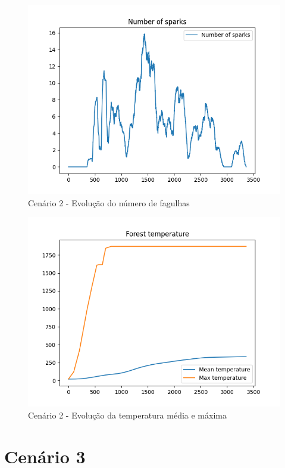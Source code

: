 \begin{figure}[H]
    \centering
    \includegraphics[width=\textwidth]{../src/runs/scenario2/sparks}
    \caption{Cenário 2 - Evolução do número de fagulhas}
    \label{fig:S2Sparks}
\end{figure}

\begin{figure}[H]
    \centering
    \includegraphics[width=\textwidth]{../src/runs/scenario2/temperature}
    \caption{Cenário 2 - Evolução da temperatura média e máxima}
    \label{fig:S2Temp}
\end{figure}


\section{Cenário 3}\label{sec:scenario3}

